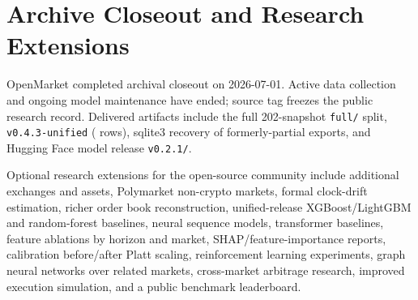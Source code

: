 \section{Archive Closeout and Research Extensions}
\label{sec:future-work}

OpenMarket completed archival closeout on 2026-07-01. Active data collection and
ongoing model maintenance have ended; source tag \OpenMarketReleaseTag{} freezes
the public research record. Delivered artifacts include the full 202-snapshot
\texttt{full/} split, \texttt{v0.4.3-unified} (\OpenMarketTotalRows{} rows),
sqlite3 recovery of formerly-partial exports, and Hugging Face model release
\texttt{v0.2.1/}.

Optional research extensions for the open-source community include additional
exchanges and assets, Polymarket non-crypto markets, formal clock-drift
estimation, richer order book reconstruction, unified-release XGBoost/LightGBM
and random-forest baselines, neural sequence models, transformer baselines,
feature ablations by horizon and market, SHAP/feature-importance reports,
calibration before/after Platt scaling, reinforcement learning experiments,
graph neural networks over related markets, cross-market arbitrage research,
improved execution simulation, and a public benchmark leaderboard.
